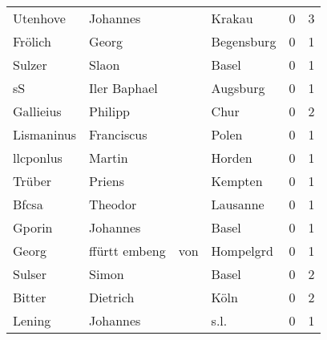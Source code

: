 \begin{center}
\begin{tiny}
\begin{longtabu}{llllrr}
                 Utenhove &                           Johannes &             &                                      Krakau &          0 &         3 \\
                  Frölich &                              Georg &             &                                  Begensburg &          0 &         1 \\
                   Sulzer &                              Slaon &             &                                       Basel &          0 &         1 \\
                       sS &                       Iler Baphael &             &                                    Augsburg &          0 &         1 \\
                Gallieius &                            Philipp &             &                                        Chur &          0 &         2 \\
               Lismaninus &                         Franciscus &             &                                       Polen &          0 &         1 \\
                llcponlus &                             Martin &             &                                      Horden &          0 &         1 \\
                   Trüber &                             Priens &             &                                     Kempten &          0 &         1 \\
                    Bfcsa &                            Theodor &             &                                    Lausanne &          0 &         1 \\
                   Gporin &                           Johannes &             &                                       Basel &          0 &         1 \\
                    Georg &                      ffürtt embeng &         von &                                   Hompelgrd &          0 &         1 \\
                   Sulser &                              Simon &             &                                       Basel &          0 &         2 \\
                   Bitter &                           Dietrich &             &                                        Köln &          0 &         2 \\
                   Lening &                           Johannes &             &                                        s.l. &          0 &         1 \\

\end{longtabu}
\end{tiny}
\end{center}
